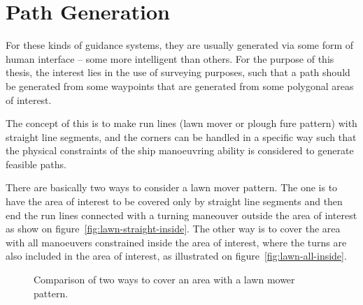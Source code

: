\chapter{Path Generation}
\label{ch:pathgen}

\noindent For these kinds of guidance systems, they are usually generated via some
form of human interface -- some more intelligent than others. For the
purpose of this thesis, the interest lies in the use of surveying
purposes, such that a path should be generated from some waypoints
that are generated from some polygonal areas of interest.

The concept of this is to make run lines (lawn mover or plough fure pattern) with
straight line segments, and the corners can be handled in a specific
way such that the physical constraints of the ship manoeuvring ability
is considered to generate feasible paths.

There are basically two ways to consider a lawn mover pattern. The
one is to have the area of interest to be covered only by straight line
segments and then end the run lines connected with a turning maneouver outside the
area of interest as show on figure~\vref{fig:lawn-straight-inside}. The other way is to cover the area with all manoeuvers constrained inside the area of interest, where the turns are also included in the area of interest, as illustrated on figure~\vref{fig:lawn-all-inside}.

\begin{figure}[htbp]
	\centering
	\qquad
	\caption{Comparison of two ways to cover an area with a lawn mower
	pattern.}
\end{figure}

